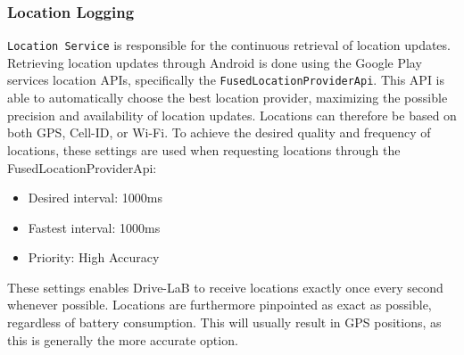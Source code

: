 \subsubsection{Location Logging}\label{subsubsec:location_logging}
\texttt{Location Service} is responsible for the continuous retrieval of location updates. Retrieving location updates through Android is done using the Google Play services location APIs, specifically the \texttt{FusedLocationProviderApi}\citep{android_fusedlocationproviderapi}. This API is able to automatically choose the best location provider, maximizing the possible precision and availability of location updates. Locations can therefore be based on both GPS, Cell-ID, or Wi-Fi. To achieve the desired quality and frequency of locations, these settings are used when requesting locations through the FusedLocationProviderApi:

\begin{itemize}
\item Desired interval: 1000ms
\item Fastest interval: 1000ms
\item Priority: High Accuracy
\end{itemize}

These settings enables Drive-LaB to receive locations exactly once every second whenever possible. Locations are furthermore pinpointed as exact as possible, regardless of battery consumption. This will usually result in GPS positions, as this is generally the more accurate option.
